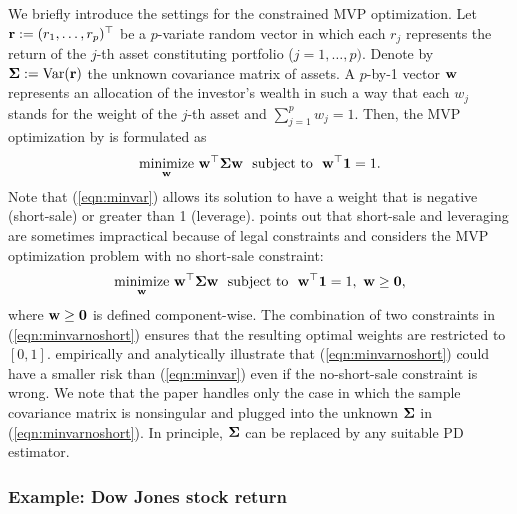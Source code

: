 \documentclass[times,sort&compress,3p]{elsarticle}
\newcommand{\minimize}{\mathop{\rm minimize}}
\newcommand{\var}{{\rm Var}}
\begin{document}
We briefly introduce the settings for the constrained MVP optimization.
Let ${\bf r}:= (r_1, \ldots, r_p)^{\top}$ be a $p$-variate random vector in
which each $r_j$ represents the return of the $j$-th asset constituting portfolio ($j = 1, \ldots, p)$.
Denote by ${\bf \Sigma}:= \var ({\bf r})$ the unknown covariance matrix of assets.
A $p$-by-1 vector ${\bf w}$ represents an allocation of the investor's wealth in such a way that each $w_j$ stands for the weight of the $j$-th asset and $\sum_{j=1}^p w_j = 1$.
Then, the MVP optimization by \citet{Chan1999} is formulated as
%
\begin{equation}\label{eqn:minvar}
\minimize_{\bf w}\, {\bf w}^{\top}{\bf \Sigma}{\bf w} ~~\mbox{subject to}~~
	{\bf w}^{\top}{\bf 1} = 1.
\end{equation}
%
Note that (\ref{eqn:minvar}) allows its solution to have a weight that is negative (short-sale) or greater than 1 (leverage). 
\citet{Jagannathan2003} points out that short-sale and leveraging are sometimes impractical because of
legal constraints and considers  the MVP optimization problem with no short-sale constraint:
\begin{equation}\label{eqn:minvarnoshort}
\minimize_{\bf w}\, {\bf w}^{\top}{\bf \Sigma}{\bf w} ~~\mbox{subject to}~~
	{\bf w}^{\top}{\bf 1} = 1, ~ {\bf w} \geq {\bf 0},
\end{equation}
where ${\bf w} \geq {\bf 0}$ is defined component-wise.
%
The combination of two constraints in (\ref{eqn:minvarnoshort}) ensures that the resulting optimal weights  are restricted to $[0,1]$.
\citet{Jagannathan2003} empirically and analytically illustrate that (\ref{eqn:minvarnoshort})
could have a smaller risk than (\ref{eqn:minvar})
even if the no-short-sale constraint is wrong. We note that the paper handles only the case in which the sample
covariance matrix is nonsingular and plugged into the unknown ${\bf \Sigma}$ in (\ref{eqn:minvarnoshort}). In principle, ${\bf \Sigma}$ can be replaced by any suitable PD estimator.


\subsubsection{Example: Dow Jones stock return}
\end{document}
